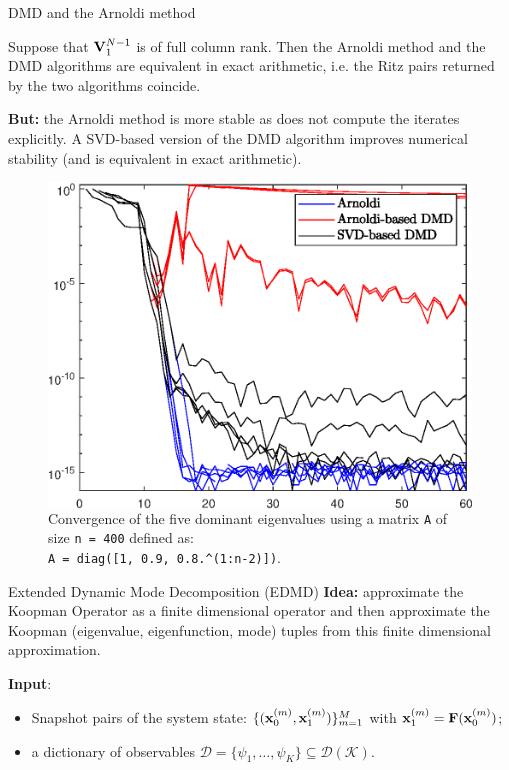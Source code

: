 \documentclass{beamer}
\begin{document}
\begin{frame}{DMD and the Arnoldi method}
\begin{prop}
Suppose that $\vb{V}_1^{N-1}$ is of full column rank. Then the Arnoldi method and the DMD algorithms are equivalent in exact arithmetic, i.e. the Ritz pairs returned by the two algorithms coincide. 
\end{prop}
\alert{\textbf{But:}} the Arnoldi method is more stable as does not compute the iterates explicitly. A SVD-based version of the DMD algorithm improves numerical stability (and is equivalent in exact arithmetic).
\begin{figure}[h]
    \begin{columns}
        \includegraphics[width=\linewidth]{../code/figures/Arnoldi_vs_DMD.eps}
        \caption{Convergence of the five dominant eigenvalues using a matrix \texttt{A} of size \texttt{n = 400} defined as:\\ \texttt{A = diag([1, 0.9, 0.8.\^{}(1:n-2)])}.}
      \end{columns}
\end{figure}
\end{frame}

\begin{frame}{Extended Dynamic Mode Decomposition (EDMD)}
\alert{\textbf{Idea:}} approximate the Koopman Operator as a finite dimensional operator and then approximate the Koopman (eigenvalue, eigenfunction, mode) tuples from this finite dimensional approximation. 

\medskip
\textbf{Input}:
\begin{itemize}
    \item Snapshot pairs of the system state: $\{(\vb{x}_0^{(m)}, \vb{x}_1^{(m)})\}_{m = 1}^M$ with $\vb{x}_1^{(m)} = \vb{F}(\vb{x}_0^{(m)})$;
    \item a dictionary of observables $\mathcal{D} = \{\psi_1, \dots, \psi_K\} \subseteq \mathcal{D}(\mathcal{K})$.
\end{itemize}
\end{frame}
\end{document}
